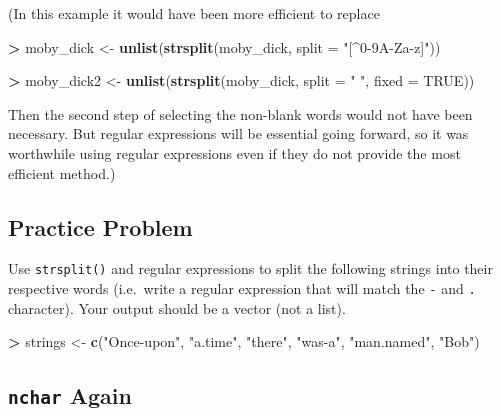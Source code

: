 \documentclass[]{krantz}
\makeatletter
\newenvironment{Shaded}{\begin{snugshade}}{\end{snugshade}}
\newcommand{\KeywordTok}[1]{\textcolor[rgb]{0.27,0.27,0.27}{\textbf{#1}}}
\newcommand{\DataTypeTok}[1]{\textcolor[rgb]{0.27,0.27,0.27}{#1}}
\newcommand{\StringTok}[1]{\textcolor[rgb]{0.5,0.5,0.5}{#1}}
\newcommand{\OtherTok}[1]{\textcolor[rgb]{0.37,0.37,0.37}{#1}}
\newcommand{\OperatorTok}[1]{\textcolor[rgb]{0.43,0.43,0.43}{\textbf{#1}}}
\newcommand{\NormalTok}[1]{#1}
\newenvironment{kframe}{%
\medskip{}
\setlength{\fboxsep}{.8em}
 \def\at@end@of@kframe{}%
 \ifinner\ifhmode%
  \def\at@end@of@kframe{\end{minipage}}%
  \begin{minipage}{\columnwidth}%
 \fi\fi%
 \def\FrameCommand##1{\hskip\@totalleftmargin \hskip-\fboxsep
 \colorbox{shadecolor}{##1}\hskip-\fboxsep
     \hskip-\linewidth \hskip-\@totalleftmargin \hskip\columnwidth}%
 \MakeFramed {\advance\hsize-\width
   \@totalleftmargin\z@ \linewidth\hsize
   \@setminipage}}%
 {\par\unskip\endMakeFramed%
 \at@end@of@kframe}
\renewenvironment{Shaded}{\begin{kframe}}{\end{kframe}}
\makeatother
\begin{document}
(In this example it would have been more efficient to replace

\begin{Shaded}
\begin{Highlighting}[]
\OperatorTok{>}\StringTok{ }\NormalTok{moby_dick <-}\StringTok{ }\KeywordTok{unlist}\NormalTok{(}\KeywordTok{strsplit}\NormalTok{(moby_dick, }\DataTypeTok{split =} \StringTok{"[^0-9A-Za-z]"}\NormalTok{))}
\end{Highlighting}
\end{Shaded}

\begin{Shaded}
\begin{Highlighting}[]
\OperatorTok{>}\StringTok{ }\NormalTok{moby_dick2 <-}\StringTok{ }\KeywordTok{unlist}\NormalTok{(}\KeywordTok{strsplit}\NormalTok{(moby_dick, }\DataTypeTok{split =} \StringTok{" "}\NormalTok{, }\DataTypeTok{fixed =} \OtherTok{TRUE}\NormalTok{))}
\end{Highlighting}
\end{Shaded}

Then the second step of selecting the non-blank words would not have
been necessary. But regular expressions will be essential going forward,
so it was worthwhile using regular expressions even if they do not
provide the most efficient method.)

\subsection{Practice Problem}\label{practice-problem-14}

Use \texttt{strsplit()} and regular expressions to split the following
strings into their respective words (i.e.~write a regular expression
that will match the \texttt{-} and \texttt{.} character). Your output
should be a vector (not a list).

\begin{Shaded}
\begin{Highlighting}[]
\OperatorTok{>}\StringTok{ }\NormalTok{strings <-}\StringTok{ }\KeywordTok{c}\NormalTok{(}\StringTok{"Once-upon"}\NormalTok{, }\StringTok{"a.time"}\NormalTok{, }\StringTok{"there"}\NormalTok{, }\StringTok{"was-a"}\NormalTok{, }\StringTok{"man.named"}\NormalTok{, }\StringTok{"Bob"}\NormalTok{)}
\end{Highlighting}
\end{Shaded}

\subsection{\texorpdfstring{\texttt{nchar}
Again}{nchar Again}}\label{nchar-again}
\end{document}
